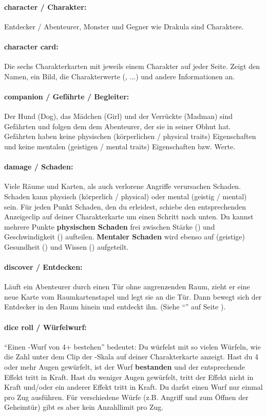 \paragraph{character / Charakter:} Entdecker / Abenteurer, Monster und Gegner wie Drakula sind Charaktere.

\paragraph{character card:} Die sechs Charakterkarten mit jeweils einem Charakter auf jeder Seite. Zeigt den Namen, ein Bild, die Charakterwerte (\might, ...) und andere Informationen an.

\paragraph{companion / Gefährte / Begleiter:} Der Hund (Dog), das Mädchen (Girl) und der Verrückte (Madman) sind Gefährten und folgen dem dem Abenteurer, der sie in seiner Obhut hat. Gefährten haben keine physischen (körperlichen / physical traits) Eigenschaften und keine mentalen (geistigen / mental traits) Eigenschaften bzw. Werte.

\paragraph{damage / Schaden:} Viele Räume und Karten, als auch verlorene Angriffe verursachen Schaden. Schaden kann physisch (körperlich / physical) oder mental (geistig / mental) sein. Für jeden Punkt Schaden, den du erleidest, schiebe den entsprechenden Anzeigeclip auf deiner Charakterkarte um einen Schritt nach unten. Du kannst mehrere Punkte \textbf{physischen Schaden} frei zwischen Stärke (\might) und Geschwindigkeit (\speed) aufteilen. \textbf{Mentaler Schaden} wird ebenso auf (geistige) Gesundheit (\sanity) und Wissen (\know) aufgeteilt.

\paragraph{discover / Entdecken:} Läuft ein Abenteurer durch einen Tür ohne angrenzenden Raum, zieht er eine neue Karte vom Raumkartenstapel und legt sie an die Tür. Dann bewegt sich der Entdecker in den Raum hinein und entdeckt ihn. (Siehe ``'' auf Seite \pageref{kap:rule:discoverroom}).

\paragraph{dice roll / Würfelwurf:} ``Einen \know-Wurf von 4+ bestehen'' bedeutet: Du würfelst mit so vielen Würfeln, wie die Zahl unter dem Clip der \know-Skala auf deiner Charakterkarte anzeigt. Hast du 4 oder mehr Augen gewürfelt, ist der Wurf \textbf{bestanden} und der entsprechende Effekt tritt in Kraft. Hast du weniger Augen gewürfelt, tritt der Effekt nicht in Kraft und/oder ein anderer Effekt tritt in Kraft. Du darfst einen Wurf nur einmal pro Zug ausführen. Für verschiedene Würfe (z.B. Angriff und \knowroll zum Öffnen der Geheimtür) gibt es aber kein Anzahllimit pro Zug.

